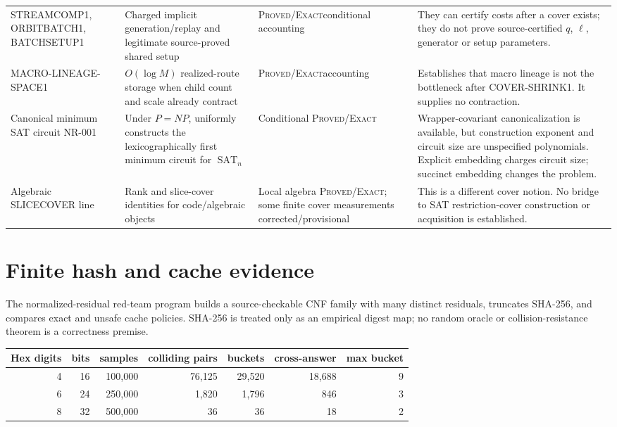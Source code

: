 \documentclass[11pt]{article}
\newcommand{\SAT}{\operatorname{SAT}}
\newcommand{\Exact}{\textsc{Proved/Exact}}
\begin{document}
\begin{longtable}{L{0.16\textwidth}L{0.22\textwidth}L{0.17\textwidth}L{0.33\textwidth}}
STREAMCOMP1, ORBITBATCH1, BATCHSETUP1 & Charged implicit generation/replay and legitimate source-proved shared setup & \Exact{}\newline conditional accounting & They can certify costs after a cover exists; they do not prove source-certified $q$, $\ell$, generator or setup parameters. \\

MACRO-LINEAGE-SPACE1 & $O(\log M)$ realized-route storage when child count and scale already contract & \Exact{}\newline accounting & Establishes that macro lineage is not the bottleneck after COVER-SHRINK1.  It supplies no contraction. \\

Canonical minimum SAT circuit NR-001 & Under $P=NP$, uniformly constructs the lexicographically first minimum circuit for $\SAT_n$ & Conditional \Exact & Wrapper-covariant canonicalization is available, but construction exponent and circuit size are unspecified polynomials.  Explicit embedding charges circuit size; succinct embedding changes the problem. \\

Algebraic SLICECOVER line & Rank and slice-cover identities for code/algebraic objects & Local algebra \Exact; some finite cover measurements corrected/provisional & This is a different cover notion.  No bridge to SAT restriction-cover construction or acquisition is established. \\

\end{longtable}
\normalsize

\section{Finite hash and cache evidence}

The normalized-residual red-team program builds a source-checkable CNF family
with many distinct residuals, truncates SHA-256, and compares exact and unsafe
cache policies.  SHA-256 is treated only as an empirical digest map; no random
oracle or collision-resistance theorem is a correctness premise.

\begin{center}
\begin{tabular}{rrrrrrr}
\toprule
Hex digits & bits & samples & colliding pairs & buckets & cross-answer & max bucket\\
\midrule
4 & 16 & 100,000 & 76,125 & 29,520 & 18,688 & 9\\
6 & 24 & 250,000 & 1,820 & 1,796 & 846 & 3\\
8 & 32 & 500,000 & 36 & 36 & 18 & 2\\
\bottomrule
\end{tabular}
\end{center}
\end{document}
